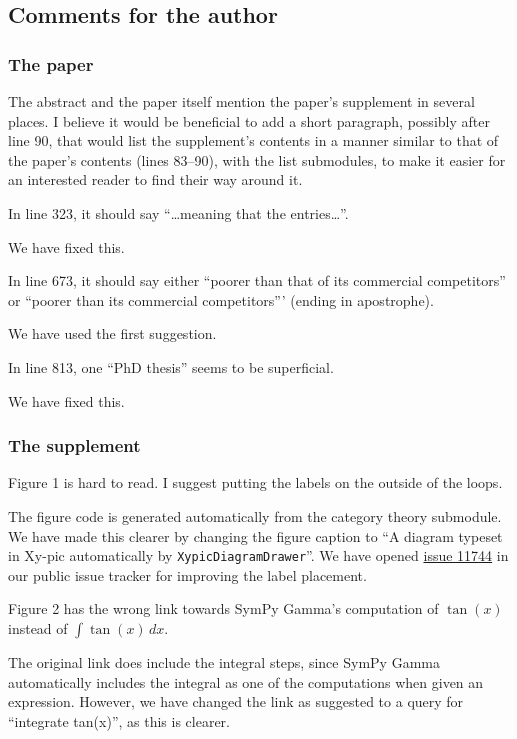 \documentclass[answers,12pt]{exam}
\begin{document}
\subsection{Comments for the author}
\subsubsection{The paper}

\begin{questions}
\question The abstract and the paper itself mention the paper's supplement in several places. I believe it would be beneficial to add a short paragraph, possibly after line 90, that would list the supplement's contents in a manner similar to that of the paper's contents (lines 83--90), with the list submodules, to make it easier for an interested reader to find their way around it.
\begin{solution}

\end{solution}

\question In line 323, it should say ``\ldots meaning that the entries\ldots''.
\begin{solution}
We have fixed this.
\end{solution}

\question In line 673, it should say either ``poorer than that of its commercial competitors'' or ``poorer than its commercial competitors''' (ending in apostrophe).
\begin{solution}
We have used the first suggestion.
\end{solution}

\question In line 813, one ``PhD thesis'' seems to be superficial.
\begin{solution}
We have fixed this.
\end{solution}

\subsubsection{The supplement}

\question Figure 1 is hard to read. I suggest putting the labels on the outside of the loops.
\begin{solution}
The figure code is generated automatically from the category theory submodule. We
have made this clearer by changing the figure caption to ``A diagram typeset
in Xy-pic automatically by \texttt{XypicDiagramDrawer}''. We have opened
\href{https://github.com/sympy/sympy/issues/11744}{issue 11744} in our public
issue tracker for improving the label placement.
\end{solution}

\question Figure 2 has the wrong link towards SymPy Gamma's computation of $\tan(x)$
 instead of $\int \tan(x)\,dx$.
\begin{solution}
The original link does include the integral steps, since SymPy Gamma
automatically includes the integral as one of the computations when given an
expression. However, we have changed the link as suggested to a query for
``integrate tan(x)'', as this is clearer.
\end{solution}

\end{questions}
\end{document}
